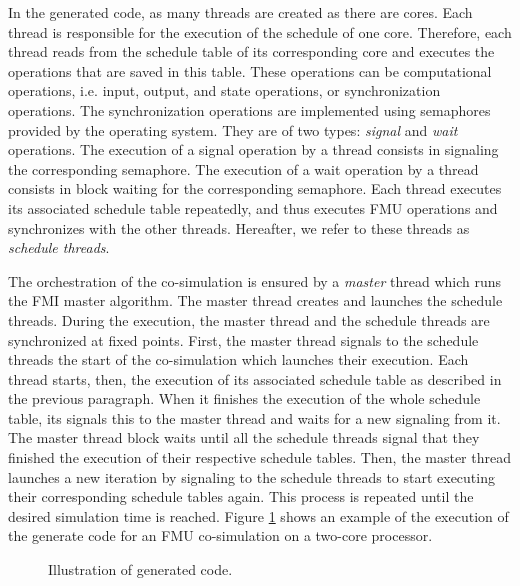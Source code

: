 In the generated code, as many threads are created as there are cores. Each thread is responsible for the execution of the schedule of one core. Therefore, each thread reads from the schedule table of its corresponding core and executes the operations that are saved in this table. These operations can be computational operations, i.e. input, output, and state operations, or synchronization operations. The synchronization operations are implemented using semaphores provided by the operating system. They are of two types: \textit{signal} and \textit{wait} operations. The execution of a signal operation by a thread consists in signaling the corresponding semaphore. The execution of a wait operation by a thread consists in block waiting for the corresponding semaphore. Each thread executes its associated schedule table repeatedly, and thus executes FMU operations and synchronizes with the other threads. Hereafter, we refer to these threads as \textit{schedule threads}. 

The orchestration of the co-simulation is ensured by a \textit{master} thread which runs the FMI master algorithm. The master thread creates and launches the schedule threads. During the execution, the master thread and the schedule threads are synchronized at fixed points. First, the master thread signals to the schedule threads the start of the co-simulation which launches their execution. Each thread starts, then, the execution of its associated schedule table as described in the previous paragraph. When it finishes the execution of the whole schedule table, its signals this to the master thread and waits for a new signaling from it. The master thread block waits until all the schedule threads signal that they finished the execution of their respective schedule tables. Then, the master thread launches a new iteration by signaling to the schedule threads to start executing their corresponding schedule tables again. This process is repeated until the desired simulation time is reached. Figure \ref{fig:codegen} shows an example of the execution of the generate code for an FMU co-simulation on a two-core processor.

\begin{figure}[phbt]
\centering

\caption{Illustration of generated code.}
\label{fig:codegen}
\end{figure}   


